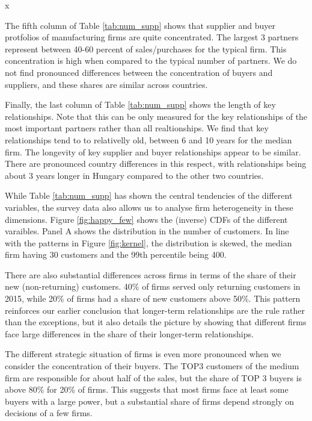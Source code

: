 x\documentclass[final, dvipsnames, authoryear,12pt]{elsarticle}
\begin{document}
The fifth column of Table \ref{tab:num_supp} shows that supplier and buyer protfolios of manufacturing firms are quite concentrated. The largest 3 partners represent between 40-60 percent of sales/purchases for the typical firm. This concentration is high when compared to the typical number of partners. We do not find pronounced differences between the concentration of buyers and suppliers, and these shares are similar across countries.

Finally, the last column of Table \ref{tab:num_supp} shows the length of key relationships. Note that this can be only measured for the key relationships of the most important partners rather than all realtionships. We find that key relationships tend to to relativelly old, between 6 and 10 years for the median firm. The longevity of key supplier and buyer relationships appear to be similar. There are pronounced country differences in this respect, with relationships being about 3 years longer in Hungary compared to the other two countries. 

While Table \ref{tab:num_supp} has shown the central tendencies of the different variables, the survey data also allows us to analyse firm heterogeneity in these dimensions. Figure \ref{fig:happy_few} shows the (inverse) CDFs of the different varaibles. Panel A shows the distribution in the number of customers. In line with the patterns in Figure \ref{fig:kernel}, the distribution is skewed, the median firm having 30 customers and the 99th percentile being 400.

There are also substantial differences across firms in terms of the share of their new (non-returning) customers. 40\% of firms served only returning customers in 2015, while 20\% of firms had a share of new customers above 50\%. This pattern reinforces our earlier conclusion that longer-term relationships are the rule rather than the exceptions, but it also details the picture by showing that different firms face large differences in the share of their longer-term relationships.

The different strategic situation of firms is even more pronounced when we consider the concentration of their buyers. The TOP3 customers of the medium firm are responsible for about half of the sales, but the share of TOP 3 buyers is above 80\% for 20\% of firms. This suggests that most firms face at least some buyers with a large power, but a substantial share of firms depend strongly on decisions of a few firms.
\end{document}
